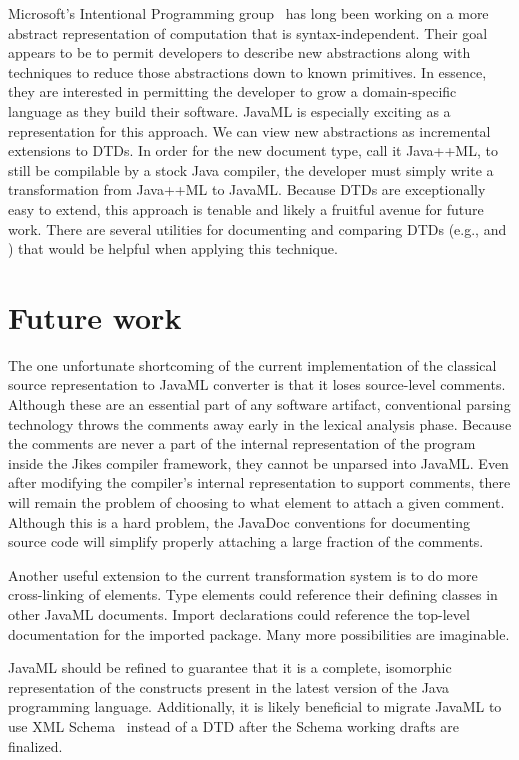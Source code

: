 \documentclass{article}
\begin{document}
Microsoft's Intentional Programming group~\cite{Simonyi96} has long been
working on a more abstract representation of computation that is
syntax-independent.  Their goal appears to be to permit developers to
describe new abstractions along with techniques to reduce those
abstractions down to known primitives.  In essence, they are interested
in permitting the developer to grow a domain-specific language as they
build their software.  JavaML is especially exciting as a representation
for this approach.  We can view new abstractions as incremental
extensions to DTDs.  In order for the new document type, call it
Java++ML, to still be compilable by a stock Java compiler, the developer
must simply write a transformation from Java++ML to JavaML.  Because
DTDs are exceptionally easy to extend, this approach is tenable and
likely a fruitful avenue for future work.  There are several utilities
for documenting and comparing DTDs (e.g.,  and
) that would be helpful when applying this technique.


\section{Future work}
\label{sec-future}

The one unfortunate shortcoming of the current implementation of the
classical source representation to JavaML converter is that it loses
source-level comments.  Although these are an essential part of any
software artifact, conventional parsing technology throws the comments
away early in the lexical analysis phase.  Because the comments are
never a part of the internal representation of the program inside the
Jikes compiler framework, they cannot be unparsed into JavaML.  Even
after modifying the compiler's internal representation to support
comments, there will remain the problem of choosing to what element to
attach a given comment.  Although this is a hard problem, the JavaDoc
conventions for documenting source code will simplify properly attaching
a large fraction of the comments.

Another useful extension to the current transformation system is to do
more cross-linking of elements.  Type elements could reference their
defining classes in other JavaML documents.  Import declarations could
reference the top-level documentation for the imported package.  Many
more possibilities are imaginable.

JavaML should be refined to guarantee that it is a complete, isomorphic
representation of the constructs present in the latest version of the
Java programming language.  Additionally, it is likely beneficial to
migrate JavaML to use XML Schema~\cite{XMLSchema1,XMLSchema2} instead of
a DTD after the Schema working drafts are finalized.
\end{document}
